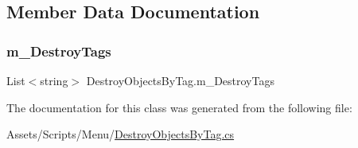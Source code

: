 \subsection{Member Data Documentation}
\mbox{\label{class_destroy_objects_by_tag_a2776935369c22f6d6d44fa7bbd704c35}} 
\subsubsection{\texorpdfstring{m\_DestroyTags}{m\_DestroyTags}}
{\footnotesize\ttfamily List$<$string$>$ Destroy\+Objects\+By\+Tag.\+m\+\_\+\+Destroy\+Tags}



The documentation for this class was generated from the following file\+:\begin{DoxyCompactItemize}
\item 
Assets/\+Scripts/\+Menu/\mbox{\hyperlink{_destroy_objects_by_tag_8cs}{Destroy\+Objects\+By\+Tag.\+cs}}\end{DoxyCompactItemize}
